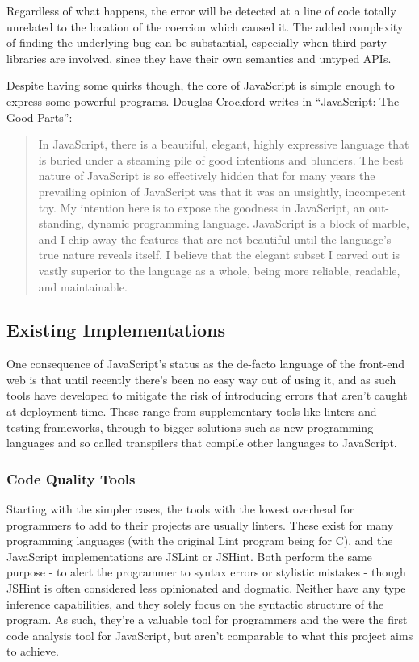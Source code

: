 \documentclass[british, twoside]{bhamthesis}
\theoremstyle{definition}
\begin{document}
    Regardless of what happens, the error will be detected at a line of code totally unrelated to the location of the coercion which caused it. The added complexity of finding the underlying bug can be substantial, especially when third-party libraries are involved, since they have their own semantics and untyped APIs.

    Despite having some quirks though, the core of JavaScript is simple enough to express some powerful programs. Douglas Crockford writes in “JavaScript: The Good Parts”:

    \begin{quote}
      In JavaScript, there is a beautiful, elegant, highly expressive language that is buried under a steaming pile of good intentions and blunders. The best nature of JavaScript is so effectively hidden that for many years the prevailing opinion of JavaScript was that it was an unsightly, incompetent toy. My intention here is to expose the goodness in JavaScript, an out- standing, dynamic programming language. JavaScript is a block of marble, and I chip away the features that are not beautiful until the language’s true nature reveals itself. I believe that the elegant subset I carved out is vastly superior to the language as a whole, being more reliable, readable, and maintainable.
    \end{quote}
    \autocite{Crockford2008}

  \subsection{Existing Implementations}
    One consequence of JavaScript's status as the de-facto language of the front-end web is that until recently there's been no easy way out of using it, and as such tools have developed to mitigate the risk of introducing errors that aren't caught at deployment time. These range from supplementary tools like linters and testing frameworks, through to bigger solutions such as new programming languages and so called transpilers that compile other languages to JavaScript.

  \subsubsection{Code Quality Tools}

    Starting with the simpler cases, the tools with the lowest overhead for programmers to add to their projects are usually linters. These exist for many programming languages (with the original Lint program being for C), and the JavaScript implementations are JSLint or JSHint. Both perform the same purpose - to alert the programmer to syntax errors or stylistic mistakes - though JSHint is often considered less opinionated and dogmatic. Neither have any type inference capabilities, and they solely focus on the syntactic structure of the program. As such, they're a valuable tool for programmers and the were the first code analysis tool for JavaScript, but aren't comparable to what this project aims to achieve.
\end{document}
